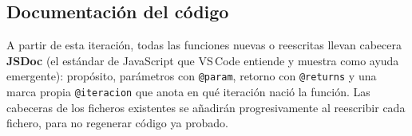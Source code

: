\subsection{Documentación del código}

A partir de esta iteración, todas las funciones nuevas o reescritas llevan cabecera \textbf{JSDoc} (el estándar de JavaScript que VS\,Code entiende y muestra como ayuda emergente): propósito, parámetros con \texttt{@param}, retorno con \texttt{@returns} y una marca propia \texttt{@iteracion} que anota en qué iteración nació la función. Las cabeceras de los ficheros existentes se añadirán progresivamente al reescribir cada fichero, para no regenerar código ya probado.

\clearpage
